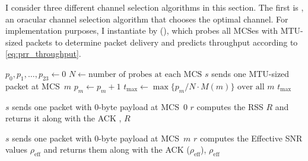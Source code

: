 I consider three different channel selection algorithms in this section. The first is , an oracular channel selection algorithm that chooses the optimal channel. For implementation purposes, I instantiate  by  (), which probes all MCSes with MTU-sized packets to determine packet delivery and predicts throughput according to \eqref{eq:prr_throughput}.

\begin{algorithm}[tp]
\caption{\label{alg:chan_sel_probe}}
\begin{algorithmic}
\STATE $p_0,p_1,\dots,p_{23} \gets 0$
\STATE $N \gets \text{number of probes at each MCS}$
\STATE $s$ sends one MTU-sized packet at MCS~$m$
\STATE $p_m \gets p_m + 1$
\ENDIF
\ENDFOR
\ENDFOR
\STATE $t_{\max}\gets \max \{p_m/N \cdot M(m)\} \text{ over all } m$ \hfill \COMMENT{\eqref{eq:prr_throughput}}
\RETURN $t_{\max}$
\end{algorithmic}
\end{algorithm}
\begin{algorithm}[tp]
\caption{\label{alg:chan_sel_rss}}
\begin{algorithmic}
\STATE $s$ sends one packet with 0-byte payload at MCS~0
\STATE $r$ computes the RSS $R$ and returns it along with the ACK
\RETURN {}, $R$ \hfill {}
\ELSE
{}
\ENDIF
\end{algorithmic}
\end{algorithm}
\begin{algorithm}[tp]
\caption{\label{alg:chan_sel_esnr}}
\begin{algorithmic}
\STATE $s$ sends one packet with 0-byte payload at MCS~$m$
\STATE $r$ computes the Effective SNR values $\rho_\text{eff}$ and returns them along with the ACK
	\RETURN {}($\rho_\text{eff}$), $\rho_\text{eff}$ \hfill {}
\ENDIF
\ENDFOR
{}
\end{algorithmic}
\end{algorithm}

